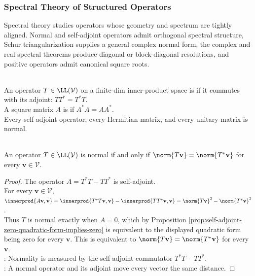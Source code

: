 \subsubsection{Spectral Theory of Structured Operators}

Spectral theory studies operators whose geometry and spectrum are tightly aligned. Normal and self-adjoint operators admit orthogonal spectral structure, Schur triangularization supplies a general complex normal form, the complex and real spectral theorems produce diagonal or block-diagonal resolutions, and positive operators admit canonical square roots.

\begin{definition} \label{def:normal-operator} \\
An operator $T\in\LL(\mathcal{V})$ on a finite-dim inner-product space is  if it commutes with its adjoint: $TT^*=T^*T$.\\
A square matrix $A$ is  if $A^*A=AA^*$.\\
Every self-adjoint operator, every Hermitian matrix, and every unitary matrix is normal.
\end{definition}

\begin{theorem} \label{thm:normal-iff-equal-adjoint-norms} \\
An operator $T\in\LL(\mathcal{V})$ is normal if and only if $\norm{T\mathbf{v}}=\norm{T^*\mathbf{v}}$ for every $\mathbf{v}\in\mathcal{V}$.
\begin{proof}
The operator $A=T^*T-TT^*$ is self-adjoint.\\
For every $\mathbf{v}\in\mathcal{V}$, $\innerprod{A\mathbf{v},\mathbf{v}} =\innerprod{T^*T\mathbf{v},\mathbf{v}}-\innerprod{TT^*\mathbf{v},\mathbf{v}} =\norm{T\mathbf{v}}^2-\norm{T^*\mathbf{v}}^2$.\\
Thus $T$ is normal exactly when $A=0$, which by Proposition \ref{prop:self-adjoint-zero-quadratic-form-implies-zero} is equivalent to the displayed quadratic form being zero for every $\mathbf{v}$. This is equivalent to $\norm{T\mathbf{v}}=\norm{T^*\mathbf{v}}$ for every $\mathbf{v}$.\\
: Normality is measured by the self-adjoint commutator $T^*T-TT^*$.\\
: A normal operator and its adjoint move every vector the same distance.
\end{proof}
\end{theorem}

